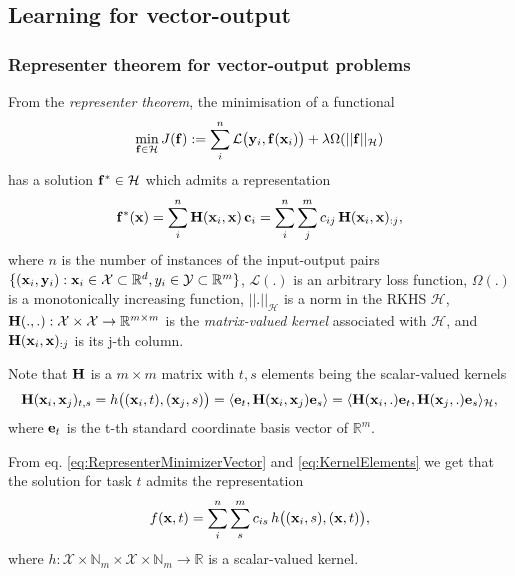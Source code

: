 \subsection{Learning for vector-output}\label{sec:LearningVectorOutput}

\subsubsection{Representer theorem for vector-output problems}

From the \emph{representer theorem}, the minimisation of a functional
\begin{equation}\label{eq:VectorProblem}
 \min_{\mathbf{f} \in \mathcal{H}} J(\mathbf{f}):= \sum_i^n \mathcal{L}\big( \mathbf{y}_i,\mathbf{f}(\mathbf{x}_i)\big) + \lambda
\Omega(||\mathbf{f}||_\mathcal{H}) 
\end{equation}
has a solution $\mathbf{f}^* \in \mathcal{H}$ which admits a representation 
\begin{equation}\label{eq:RepresenterMinimizerVector}
 \mathbf{f}^*(\mathbf{x}) = \sum_i^n \mathbf{H}(\mathbf{x}_i,\mathbf{x}) \, \mathbf{c}_i  = \sum_i^n \sum_j^m
c_{ij} \, \mathbf{H}(\mathbf{x}_i,\mathbf{x})_{:j},
\end{equation}
where $n$ is the number of instances of the input-output pairs $\{ (\mathbf{x}_i,\mathbf{y}_i):
\mathbf{x}_i \in \mathcal{X} \subset \mathbb{R}^d, y_i \in \mathcal{Y} \subset
\mathbb{R}^m \}$, 
$\mathcal{L}(.)$ is an arbitrary loss function, $\Omega(.)$ is a monotonically
increasing function, $|| . ||_\mathcal{H}$ is a norm in the RKHS $\mathcal{H}$,
$\mathbf{H}(.,.): \mathcal{X} \times \mathcal{X} \rightarrow \mathbb{R}^{m \times m} $ is the \emph{matrix-valued kernel} associated with $\mathcal{H}$,
and $\mathbf{H}(\mathbf{x}_i,\mathbf{x})_{:j}$ is its j-th column.

Note that $\mathbf{H}$ is a $m \times m$ matrix with $t,s$ elements being the scalar-valued kernels 
\begin{equation}\label{eq:KernelElements}
\mathbf{H}(\mathbf{x}_i,\mathbf{x}_j)_{t,s} = h\big(  (\mathbf{x}_i,t),(\mathbf{x}_j,s) \big) 
= \langle \mathbf{e}_t, \mathbf{H}(\mathbf{x}_i,\mathbf{x}_j) \mathbf{e}_s \rangle
= \langle \mathbf{H}(\mathbf{x}_i,.) \mathbf{e}_t, \mathbf{H}(\mathbf{x}_j,.) \mathbf{e}_s \rangle_\mathcal{H},
\end{equation}
where $\mathbf{e}_t$ is the t-th standard coordinate basis vector of $\mathbb{R}^m$.

From eq. \eqref{eq:RepresenterMinimizerVector} and \eqref{eq:KernelElements} we get that the
solution for task
$t$ admits the representation
\begin{equation}
f(\mathbf{x},t) = \sum_i^n \sum_s^m c_{is} \, h\big((\mathbf{x}_i,s),(\mathbf{x},t)\big),
\end{equation}
where $h: \mathcal{X} \times \mathbb{N}_m \times \mathcal{X} \times \mathbb{N}_m
\rightarrow \mathbb{R}$ is a scalar-valued kernel.

